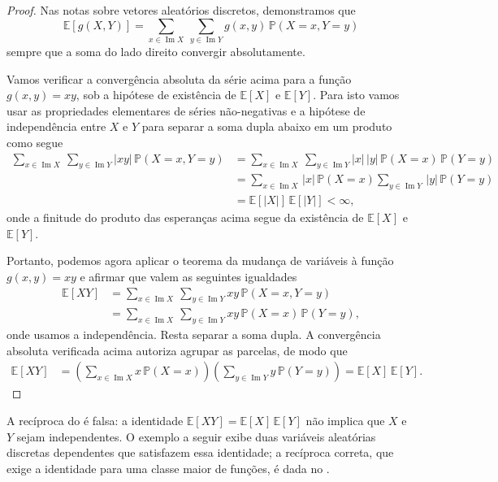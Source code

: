\documentclass[12pt,portuguese]{article}
\theoremstyle{definition}
\begin{document}
\begin{proof}
Nas notas sobre vetores aleatórios discretos, demonstramos que
\[
\mathbb{E}[g(X,Y)] = \sum_{x\in\operatorname{Im}X}\ \sum_{y\in\operatorname{Im}Y}
g(x,y)\,\mathbb{P}(X = x, Y = y)
\]
sempre que a soma do lado direito convergir absolutamente. 

Vamos verificar a convergência absoluta da série acima para a função 
$g(x,y) = xy$, sob a hipótese de existência de $\mathbb{E}[X]$ e $\mathbb{E}[Y]$. 
Para isto vamos usar as propriedades elementares de séries não-negativas e 
a hipótese de independência entre $X$ e $Y$ para separar a soma dupla abaixo 
em um produto como segue
\begin{align*}
\sum_{x\in\operatorname{Im}X}\ \sum_{y\in\operatorname{Im}Y}
|xy|\,\mathbb{P}(X = x, Y = y)
&=
\sum_{x\in\operatorname{Im}X}\ \sum_{y\in\operatorname{Im}Y}
|x|\, |y|\,\mathbb{P}(X = x)\,\mathbb{P}(Y = y)
\\[0.3cm] 
&=
\sum_{x\in\operatorname{Im}X}\, |x|\,\mathbb{P}(X = x) 
\sum_{y\in\operatorname{Im}Y}\, |y|\,\mathbb{P}(Y = y)
\\[0.3cm] 
&=
\mathbb{E}[|X|]\,\mathbb{E}[|Y|] < \infty,
\end{align*}
onde a finitude do produto das esperanças acima segue da 
existência de $\mathbb{E}[X]$ e $\mathbb{E}[Y]$.


\medskip 

Portanto, podemos agora aplicar o teorema da mudança de variáveis à função $g(x,y) = xy$ e
afirmar que valem as seguintes igualdades
\begin{align*}
\mathbb{E}[XY]
&= \sum_{x\in\operatorname{Im}X}\ \sum_{y\in\operatorname{Im}Y}
xy\,\mathbb{P}(X = x, Y = y)
\\[0.3cm]
&= \sum_{x\in\operatorname{Im}X}\ \sum_{y\in\operatorname{Im}Y}
xy\,\mathbb{P}(X = x)\,\mathbb{P}(Y = y),
\end{align*}
onde usamos a independência. Resta separar a soma dupla. A convergência
absoluta verificada acima autoriza agrupar as parcelas, de modo que
\begin{align*}
\mathbb{E}[XY]
&= \left(\sum_{x\in\operatorname{Im}X} x\,\mathbb{P}(X = x)\right)
\left(\sum_{y\in\operatorname{Im}Y} y\,\mathbb{P}(Y = y)\right)
= \mathbb{E}[X]\,\mathbb{E}[Y].
\end{align*}
\end{proof}

A recíproca do  é falsa: a identidade
$\mathbb{E}[XY] = \mathbb{E}[X]\,\mathbb{E}[Y]$ não implica que $X$ e $Y$ sejam
independentes. O exemplo a seguir exibe duas variáveis aleatórias discretas
dependentes que satisfazem essa identidade; a recíproca correta, que exige a
identidade para uma classe maior de funções, é dada no
.
\end{document}
